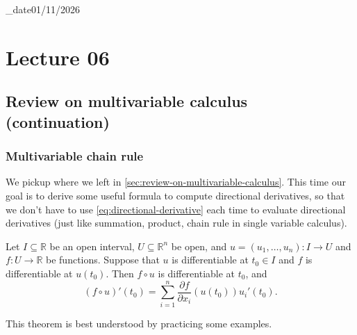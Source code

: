 \lecture_date{01/11/2026}

\chapter{Lecture 06}

\section{Review on multivariable calculus (continuation)}
\subsection{Multivariable chain rule}
We pickup where we left in \autoref{sec:review-on-multivariable-calculus}. This time our goal is to derive some useful formula to compute directional derivatives, so that we don't have to use \autoref{eq:directional-derivative} each time to evaluate directional derivatives (just like summation, product, chain rule in single variable calculus).

\begin{theorem}\label{thm:multivariable-chain-rule}
	Let $I\subseteq\mathbb{R}$ be an open interval, $U\subseteq\mathbb{R}^n$ be open, and $u=(u_1,\ldots,u_n):I\to U$ and $f:U\to\mathbb{R}$ be functions. Suppose that $u$ is differentiable at $t_0\in I$ and $f$ is differentiable at $u(t_0)$. Then $f\circ u$ is differentiable at $t_0$, and
	\begin{equation}
		(f\circ u)'(t_0)=\sum_{i=1}^n\frac{\partial f}{\partial x_i}(u(t_0))u_i'(t_0).
		\label{eq:multivariable-chain-rule-1}
	\end{equation}
\end{theorem}

This theorem is best understood by practicing some examples.

